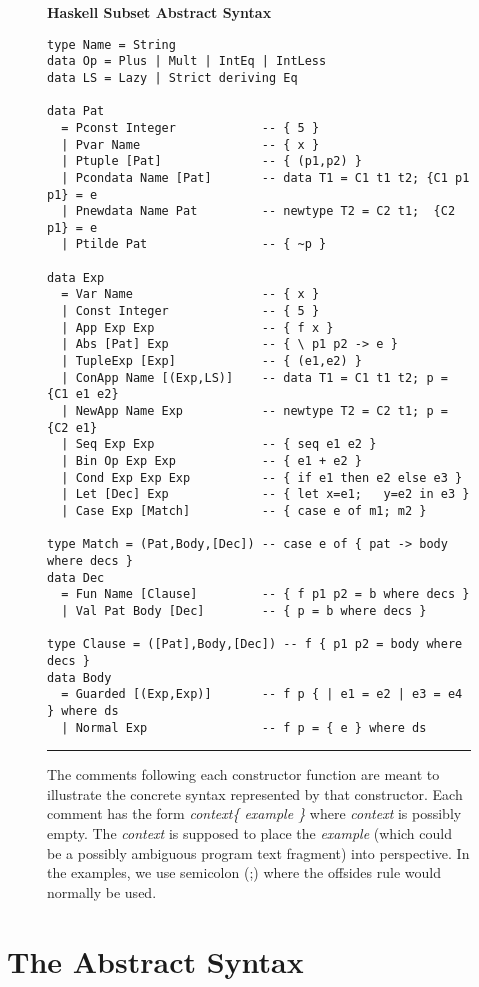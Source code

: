\documentclass{entcs} \usepackage{entcsmacro}
\begin{document}
 
\begin{figure}[t]
\begin{center} {\small {\bf Haskell Subset Abstract Syntax}}
\end{center}
{\small 
\begin{verbatim}
type Name = String
data Op = Plus | Mult | IntEq | IntLess
data LS = Lazy | Strict deriving Eq

data Pat 
  = Pconst Integer            -- { 5 }
  | Pvar Name                 -- { x }
  | Ptuple [Pat]              -- { (p1,p2) }
  | Pcondata Name [Pat]       -- data T1 = C1 t1 t2; {C1 p1 p1} = e 
  | Pnewdata Name Pat         -- newtype T2 = C2 t1;  {C2 p1} = e
  | Ptilde Pat                -- { ~p }
  
data Exp 
  = Var Name                  -- { x }
  | Const Integer             -- { 5 }
  | App Exp Exp               -- { f x }
  | Abs [Pat] Exp             -- { \ p1 p2 -> e }
  | TupleExp [Exp]            -- { (e1,e2) }
  | ConApp Name [(Exp,LS)]    -- data T1 = C1 t1 t2; p = {C1 e1 e2}
  | NewApp Name Exp           -- newtype T2 = C2 t1; p = {C2 e1}
  | Seq Exp Exp               -- { seq e1 e2 }               
  | Bin Op Exp Exp            -- { e1 + e2 }
  | Cond Exp Exp Exp          -- { if e1 then e2 else e3 }
  | Let [Dec] Exp             -- { let x=e1;   y=e2 in e3 }
  | Case Exp [Match]          -- { case e of m1; m2 }
  
type Match = (Pat,Body,[Dec]) -- case e of { pat -> body where decs } 
data Dec 
  = Fun Name [Clause]         -- { f p1 p2 = b where decs }
  | Val Pat Body [Dec]        -- { p = b where decs }

type Clause = ([Pat],Body,[Dec]) -- f { p1 p2 = body where decs }
data Body
  = Guarded [(Exp,Exp)]       -- f p { | e1 = e2 | e3 = e4 } where ds
  | Normal Exp                -- f p = { e } where ds
\end{verbatim}
}
\caption{{\footnotesize The comments following each constructor function are meant to
illustrate the concrete syntax represented by that constructor. Each comment
has the form {\em context\{ example \}} where {\em context} is possibly empty.
The {\em context} is supposed to place the {\em example} (which could be
a possibly ambiguous program text fragment) into perspective. In the examples, we use semicolon
(;) where the offsides rule would normally be used.}}\label{AST}
\hrule
\end{figure}

\section{The Abstract Syntax}
\end{document}
